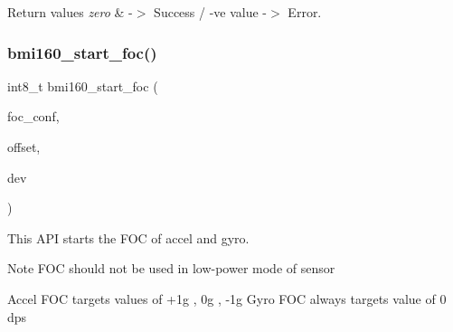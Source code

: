 \begin{DoxyRetVals}{Return values}
{\em zero} & -\/$>$ Success / -\/ve value -\/$>$ Error. \\
\hline
\end{DoxyRetVals}
\mbox{\label{group__bmi160_ga9a12ab7ac43b795f4b6faddde505eb88}} 
\subsubsection{\texorpdfstring{bmi160\+\_\+start\+\_\+foc()}{bmi160\_start\_foc()}}
{\footnotesize\ttfamily int8\+\_\+t bmi160\+\_\+start\+\_\+foc (\begin{DoxyParamCaption}\item[{const struct \hyperlink{structbmi160__foc__conf}{bmi160\+\_\+foc\+\_\+conf} $\ast$}]{foc\+\_\+conf,  }\item[{struct \hyperlink{structbmi160__offsets}{bmi160\+\_\+offsets} $\ast$}]{offset,  }\item[{struct \hyperlink{structbmi160__dev}{bmi160\+\_\+dev} const $\ast$}]{dev }\end{DoxyParamCaption})}



This A\+PI starts the F\+OC of accel and gyro. 

\begin{DoxyNote}{Note}
F\+OC should not be used in low-\/power mode of sensor

Accel F\+OC targets values of +1g , 0g , -\/1g Gyro F\+OC always targets value of 0 dps
\end{DoxyNote}

